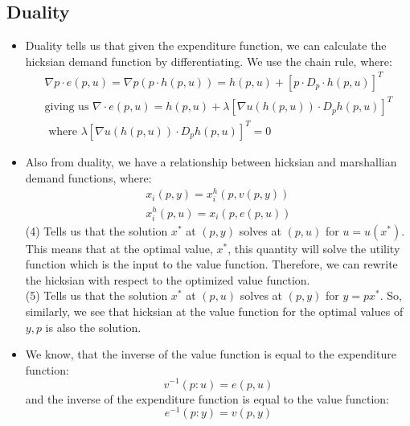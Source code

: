 \documentclass{article}
\begin{document}
\subsection{Duality}
\begin{itemize}
    \item Duality tells us that given the expenditure function, we can calculate the hicksian demand function by differentiating. We use the chain rule, where:
    \begin{align}
        \nabla p \cdot e(p,u) = \nabla p (p \cdot h(p,u)) = h(p,u) + [p \cdot D_{p} \cdot h(p,u)]^{T} \\ 
        \text{giving us } \nabla \cdot e(p,u) = h(p,u) + \lambda [\nabla u(h(p,u)) \cdot D_{p}h(p,u)]^{T}  \\ 
        \text{ where } \lambda [\nabla u(h(p,u)) \cdot D_{p}h(p,u)]^{T} = 0 
    \end{align}
    \item Also from duality, we have a relationship between hicksian and marshallian demand functions, where:
    \begin{align}
        x_i(p,y) = x^{h}_{i}(p, v(p,y)) \\
        x^{h}_{i}(p,u) = x_{i}(p, e(p,u)) 
    \end{align}
    (4) Tells us that the solution $x^*$ at $(p,y)$ solves at $(p,u)$ for $u=u(x^*)$. This means that at the optimal value, $x^*$, this quantity will solve the utility function which is the input to the value function. Therefore, we can rewrite the hicksian with respect to the optimized value function. \\
    (5) Tells us that the solution $x^*$ at $(p,u)$ solves at $(p,y)$ for $y = px^*$. So, similarly, we see that hicksian at the value function for the optimal values of $y, p$ is also the solution. 
    \item We know, that the inverse of the value function is equal to the expenditure function:
    \[
    v^{-1}(p:u) = e(p,u) 
    \] 
    and the inverse of the expenditure function is equal to the value function:
    \[
    e^{-1}(p:y) = v(p,y)
    \]
\end{itemize}
\end{document}

